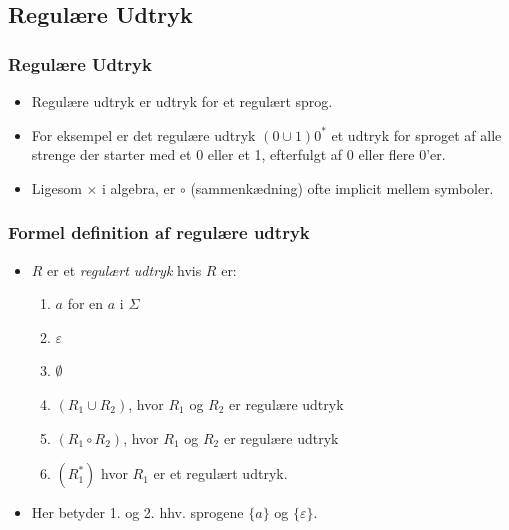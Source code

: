 \subsection{Regulære Udtryk}%
\label{subsec:regulæreudtryk}

\begin{frame}
	\frametitle{Regulære Udtryk}
	\begin{itemize}
		\item Regulære udtryk er udtryk for et regulært sprog.
		\item For eksempel er det regulære udtryk $(0 \cup 1)0^{*}$ et udtryk for sproget af alle strenge der starter med et 0 eller et 1, efterfulgt af 0 eller flere 0'er.
		\item Ligesom $\times$ i algebra, er $\circ$ (sammenkædning) ofte implicit mellem symboler.
	\end{itemize}
\end{frame}

\begin{frame}[allowframebreaks]
	\frametitle{Formel definition af regulære udtryk}
	\begin{itemize}
		\item $R$ er et \textit{regulært udtryk} hvis $R$ er:
		      \begin{enumerate}
			      \item $a$ for en $a$ i $\Sigma$
			      \item $\varepsilon$
			      \item $\emptyset$
			      \item $(R_{1} \cup R_{2})$, hvor $R_{1}$ og $R_{2}$ er regulære udtryk
			      \item $(R_{1} \circ R_{2})$, hvor $R_{1}$ og $R_{2}$ er regulære udtryk
			      \item $(R_{1}^{*})$ hvor $R_{1}$ er et regulært udtryk.
		      \end{enumerate}
		\item Her betyder 1. og 2. hhv. sprogene $\{a\}$ og $\{\varepsilon\}$.
	\end{itemize}
\end{frame}

